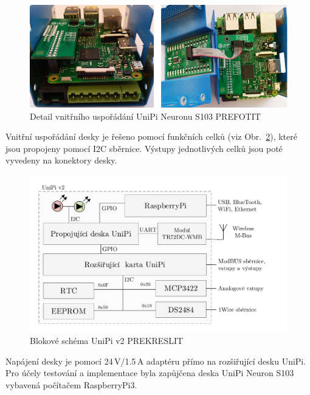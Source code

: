 \newpage{}

 \begin{figure}[!ht]
  \begin{center}
    \includegraphics[scale=0.65]{obrazky/unipi_propojuvnitr}
  \end{center}
	\caption{Detail vnitřního uspořádání UniPi Neuronu S103 \colorbox[rgb]{1,0,0}{PREFOTIT}}
	\label{PicureUniPiKrabicka}
\end{figure}

Vnitřní uspořádání desky je řešeno pomocí funkčních celků (viz Obr.~\ref{BlokUniPi2Schema}), které jsou propojeny pomocí I2C sběrnice. Výstupy jednotlivých celků jsou poté vyvedeny na konektory desky.
 \begin{figure}[!ht]
  \begin{center}
    \includegraphics[scale=0.55]{obrazky/unipi_schema2}
  \end{center}
	\caption{Blokové schéma UniPi v2 \colorbox[rgb]{1,0,0}{PREKRESLIT}}
	\label{BlokUniPi2Schema}
\end{figure}



Napájení desky je pomocí 24\,V/1.5\,A adaptéru přímo na rozšiřující desku UniPi. Pro účely testování a implementace byla zapůjčena deska UniPi Neuron S103 vybavená počítačem RaspberryPi3.

